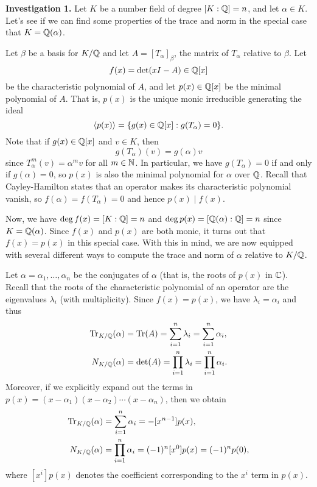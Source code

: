 {\bf Investigation 1.} Let $K$ be a number field of degree $[K : \mathbb{Q}] = n$,
and let $\alpha \in K$. Let's see if we can find some properties of 
the trace and norm in the special case that $K = \mathbb{Q}(\alpha)$.

Let $\beta$ be a basis for $K/\mathbb{Q}$ and let $A = [T_\alpha]_\beta$, the matrix 
of $T_\alpha$ relative to $\beta$. Let
\[ f(x) = \det(xI - A) \in \mathbb{Q}[x] \] 
be the characteristic polynomial of $A$, and let $p(x) \in \mathbb{Q}[x]$ be the minimal 
polynomial of $A$. That is, $p(x)$ is the unique monic irreducible 
generating the ideal 
\[ \langle p(x) \rangle = \{g(x) \in \mathbb{Q}[x] : g(T_\alpha) = 0\}. \] 
Note that if $g(x) \in \mathbb{Q}[x]$ and $v \in K$, then 
\[ g(T_\alpha)(v) = g(\alpha) v \] 
since $T_\alpha^m(v) = \alpha^m v$ for all $m \in \mathbb{N}$. In particular, we have 
$g(T_\alpha) = 0$ if and only if $g(\alpha) = 0$, so $p(x)$ is also the 
minimal polynomial for $\alpha$ over $\mathbb{Q}$. Recall that Cayley-Hamilton 
states that an operator makes its characteristic polynomial vanish, so 
$f(\alpha) = f(T_\alpha) = 0$ and hence $p(x) \mid f(x)$.

Now, we have $\deg f(x) = [K : \mathbb{Q}] = n$ and $\deg p(x) = [\mathbb{Q}(\alpha) : 
\mathbb{Q}] = n$ since $K = \mathbb{Q}(\alpha)$. Since $f(x)$ and $p(x)$ are both monic, 
it turns out that $f(x) = p(x)$ in this special case. With this in mind, 
we are now equipped with several different ways to compute the trace and 
norm of $\alpha$ relative to $K/\mathbb{Q}$.

Let $\alpha = \alpha_1, \dots, \alpha_n$ be the conjugates of $\alpha$ 
(that is, the roots of $p(x)$ in $\mathbb{C}$). Recall that the roots of the characteristic 
polynomial of an operator are the eigenvalues $\lambda_i$ (with multiplicity).
Since $f(x) = p(x)$, we have $\lambda_i = \alpha_i$ and thus
\begin{align*}
    \operatorname{Tr}_{K/\mathbb{Q}}(\alpha) &= \operatorname{Tr}(A) = \sum_{i=1}^n \lambda_i = \sum_{i=1}^n \alpha_i, \\ 
    N_{K/\mathbb{Q}}(\alpha) &= \det(A) = \prod_{i=1}^n \lambda_i = \prod_{i=1}^n \alpha_i. 
\end{align*}
Moreover, if we explicitly expand out the terms in $p(x) = (x - \alpha_1)
(x - \alpha_2) \cdots (x - \alpha_n)$, then we obtain 
\begin{align*}
    \operatorname{Tr}_{K/\mathbb{Q}}(\alpha) &= \sum_{i=1}^n \alpha_i = -[x^{n-1}] p(x), \\ 
    N_{K/\mathbb{Q}}(\alpha) &= \prod_{i=1}^n \alpha_i = (-1)^n [x^0] p(x) = 
    (-1)^n p(0),
\end{align*}
where $[x^i] p(x)$ denotes the coefficient corresponding to the $x^i$ term 
in $p(x)$.

